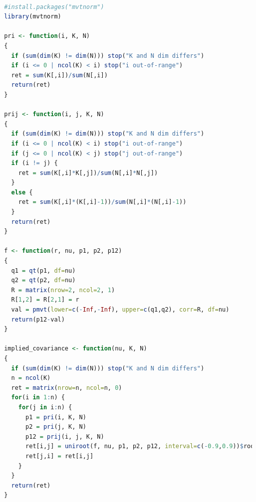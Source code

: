 \documentclass[11pt,fleqn]{book} %
\begin{document}
\begin{lstlisting}[language=R, label=sc:qadc, caption=Implied covariance (R script)]

 #install.packages("mvtnorm")
 library(mvtnorm)

 pri <- function(i, K, N)
 {
   if (sum(dim(K) != dim(N))) stop("K and N dim differs")
   if (i <= 0 | ncol(K) < i) stop("i out-of-range")
   ret = sum(K[,i])/sum(N[,i])
   return(ret)
 }

 prij <- function(i, j, K, N)
 {
   if (sum(dim(K) != dim(N))) stop("K and N dim differs")
   if (i <= 0 | ncol(K) < i) stop("i out-of-range")
   if (j <= 0 | ncol(K) < j) stop("j out-of-range")
   if (i != j) {
     ret = sum(K[,i]*K[,j])/sum(N[,i]*N[,j])
   }
   else {
     ret = sum(K[,i]*(K[,i]-1))/sum(N[,i]*(N[,i]-1))
   }
   return(ret)
 }

 f <- function(r, nu, p1, p2, p12)
 {
   q1 = qt(p1, df=nu)
   q2 = qt(p2, df=nu)
   R = matrix(nrow=2, ncol=2, 1)
   R[1,2] = R[2,1] = r
   val = pmvt(lower=c(-Inf,-Inf), upper=c(q1,q2), corr=R, df=nu)
   return(p12-val)
 }

 implied_covariance <- function(nu, K, N)
 {
   if (sum(dim(K) != dim(N))) stop("K and N dim differs")
   n = ncol(K)
   ret = matrix(nrow=n, ncol=n, 0)
   for(i in 1:n) {
     for(j in i:n) {
       p1 = pri(i, K, N)
       p2 = pri(j, K, N)
       p12 = prij(i, j, K, N)
       ret[i,j] = uniroot(f, nu, p1, p2, p12, interval=c(-0.9,0.9))$root
       ret[j,i] = ret[i,j]
     }
   }
   return(ret)
 }

\end{lstlisting}
\end{document}
